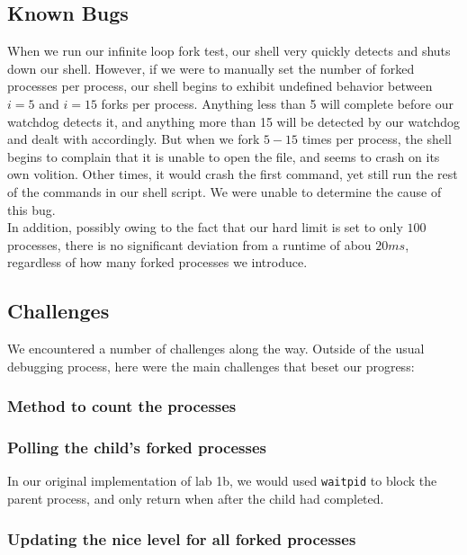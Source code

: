 \documentclass{article}
\begin{document}
\subsection{Known Bugs}
When we run our infinite loop fork test, our shell very quickly detects and
shuts down our shell. However, if we were to manually set the number of forked 
processes per process, our shell begins to exhibit undefined behavior between 
$i = 5$ and $i = 15$ forks per process. Anything less than 5 will complete
before our watchdog detects it, and anything more than 15 will be detected by
our watchdog and dealt with accordingly. But when we fork $5 - 15$ times per
process, the shell begins to complain that it is unable to open the file, and
seems to crash on its own volition. Other times, it would crash the first 
command, yet still run the rest of the commands in our shell script. We were 
unable to determine the cause of this bug.\\
In addition, possibly owing to the fact that our hard limit is set to only
$100$ processes, there is no significant deviation from a runtime of abou
$20ms$, regardless of how many forked processes we introduce. \\

\subsection{Challenges}
We encountered a number of challenges along the way. Outside of the usual 
debugging process, here were the main challenges that beset our progress:
\subsubsection{Method to count the processes}
\subsubsection{Polling the child's forked processes}
In our original implementation of lab 1b, we would used \verb+waitpid+ to block
the parent process, and only return when after the child had completed. 
\subsubsection{Updating the nice level for all forked processes}







\end{document}
